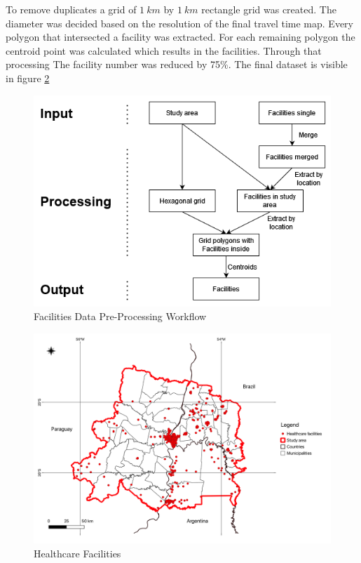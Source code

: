 \documentclass[11pt, a4paper]{report}
\begin{document}
To remove duplicates a grid of $1 \ km$ by $1\ km$ rectangle grid was created. The diameter was decided based on the resolution of the final travel time map. Every polygon that intersected a facility was extracted. For each remaining polygon the centroid point was calculated which results in the facilities. Through that processing The facility number was reduced by 75\%. The final dataset is visible in figure \ref{fig:healthcare}\\ 
%
\begin{figure}[H]
  \centering
  \includegraphics[width=0.9\linewidth]{figures/facilitiesworkflow.png}
  \caption{Facilities Data Pre-Processing Workflow}
  \label{fig:facilitiesworkflow}
\end{figure}

\begin{figure}[H]
  \centering
  \includegraphics[width=0.9\linewidth]{figures/Healthcare Facilities.png}
  \caption{Healthcare Facilities}
  \label{fig:healthcare}
\end{figure}
\end{document}
